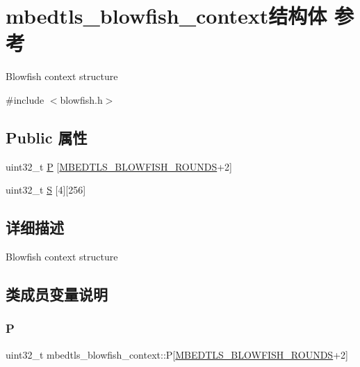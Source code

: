 \hypertarget{structmbedtls__blowfish__context}{}\section{mbedtls\+\_\+blowfish\+\_\+context结构体 参考}
\label{structmbedtls__blowfish__context}


Blowfish context structure  




{\ttfamily \#include $<$blowfish.\+h$>$}

\subsection*{Public 属性}
\begin{DoxyCompactItemize}
\item 
uint32\+\_\+t \hyperlink{structmbedtls__blowfish__context_a6797f919a5b195cef17647d3d63ec13f}{P} \mbox{[}\hyperlink{blowfish_8h_a9a9858208f44ea332105fcb68ef93f06}{M\+B\+E\+D\+T\+L\+S\+\_\+\+B\+L\+O\+W\+F\+I\+S\+H\+\_\+\+R\+O\+U\+N\+DS}+2\mbox{]}
\item 
uint32\+\_\+t \hyperlink{structmbedtls__blowfish__context_ab366ec526d9d5303483ed9c5bbb6a049}{S} \mbox{[}4\mbox{]}\mbox{[}256\mbox{]}
\end{DoxyCompactItemize}


\subsection{详细描述}
Blowfish context structure 

\subsection{类成员变量说明}
\mbox{\label{structmbedtls__blowfish__context_a6797f919a5b195cef17647d3d63ec13f}} 
\subsubsection{\texorpdfstring{P}{P}}
{\footnotesize\ttfamily uint32\+\_\+t mbedtls\+\_\+blowfish\+\_\+context\+::P\mbox{[}\hyperlink{blowfish_8h_a9a9858208f44ea332105fcb68ef93f06}{M\+B\+E\+D\+T\+L\+S\+\_\+\+B\+L\+O\+W\+F\+I\+S\+H\+\_\+\+R\+O\+U\+N\+DS}+2\mbox{]}}

